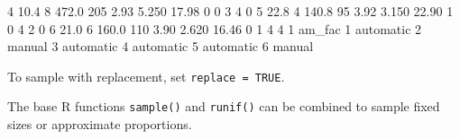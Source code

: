 \documentclass[
]{book}
\newenvironment{Shaded}{\begin{snugshade}}{\end{snugshade}}
\newcommand{\DecValTok}[1]{\textcolor[rgb]{0.00,0.00,0.81}{#1}}
\newcommand{\FloatTok}[1]{\textcolor[rgb]{0.00,0.00,0.81}{#1}}
\newcommand{\NormalTok}[1]{#1}
\begin{document}
\begin{Shaded}
\begin{Highlighting}[]
\DecValTok{4} \FloatTok{10.4}         \DecValTok{8} \FloatTok{472.0} \DecValTok{205}       \FloatTok{2.93}  \FloatTok{5.250} \FloatTok{17.98}      \DecValTok{0}  \DecValTok{0}    \DecValTok{3}    \DecValTok{4}     \DecValTok{0}
\DecValTok{5} \FloatTok{22.8}         \DecValTok{4} \FloatTok{140.8}  \DecValTok{95}       \FloatTok{3.92}  \FloatTok{3.150} \FloatTok{22.90}      \DecValTok{1}  \DecValTok{0}    \DecValTok{4}    \DecValTok{2}     \DecValTok{0}
\DecValTok{6} \FloatTok{21.0}         \DecValTok{6} \FloatTok{160.0} \DecValTok{110}       \FloatTok{3.90}  \FloatTok{2.620} \FloatTok{16.46}      \DecValTok{0}  \DecValTok{1}    \DecValTok{4}    \DecValTok{4}     \DecValTok{1}
\NormalTok{     am\_fac}
\DecValTok{1}\NormalTok{ automatic}
\DecValTok{2}\NormalTok{    manual}
\DecValTok{3}\NormalTok{ automatic}
\DecValTok{4}\NormalTok{ automatic}
\DecValTok{5}\NormalTok{ automatic}
\DecValTok{6}\NormalTok{    manual}
\end{Highlighting}
\end{Shaded}

To sample with replacement, set \texttt{replace\ =\ TRUE}.

The base R functions \texttt{sample()} and \texttt{runif()} can be combined to sample fixed sizes or approximate proportions.
\end{document}
